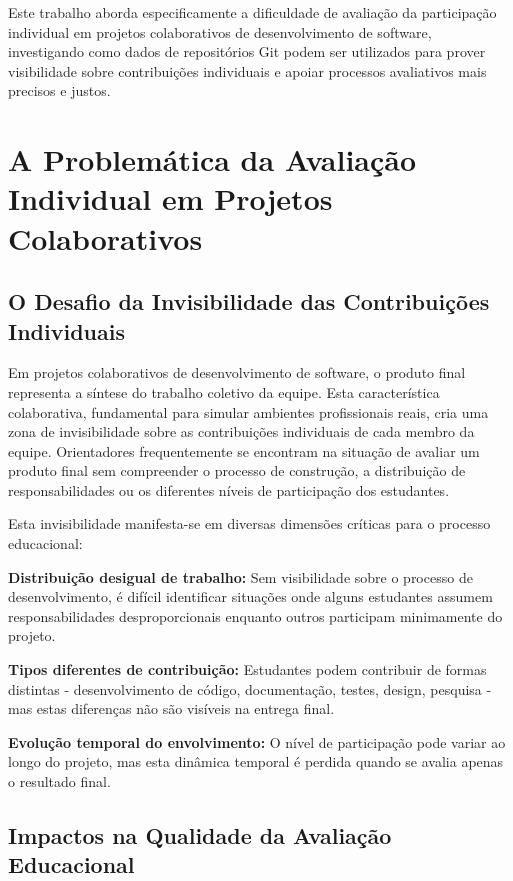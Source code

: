 \documentclass[english, spanish, brazilian]{RBIEarticle} %
\begin{document}
Este trabalho aborda especificamente a dificuldade de avaliação da participação individual em projetos colaborativos de desenvolvimento de software, investigando como dados de repositórios Git podem ser utilizados para prover visibilidade sobre contribuições individuais e apoiar processos avaliativos mais precisos e justos.

\section{A Problemática da Avaliação Individual em Projetos Colaborativos}

\subsection{O Desafio da Invisibilidade das Contribuições Individuais}

Em projetos colaborativos de desenvolvimento de software, o produto final representa a síntese do trabalho coletivo da equipe. Esta característica colaborativa, fundamental para simular ambientes profissionais reais, cria uma zona de invisibilidade sobre as contribuições individuais de cada membro da equipe. Orientadores frequentemente se encontram na situação de avaliar um produto final sem compreender o processo de construção, a distribuição de responsabilidades ou os diferentes níveis de participação dos estudantes.

Esta invisibilidade manifesta-se em diversas dimensões críticas para o processo educacional:

\textbf{Distribuição desigual de trabalho:} Sem visibilidade sobre o processo de desenvolvimento, é difícil identificar situações onde alguns estudantes assumem responsabilidades desproporcionais enquanto outros participam minimamente do projeto.

\textbf{Tipos diferentes de contribuição:} Estudantes podem contribuir de formas distintas - desenvolvimento de código, documentação, testes, design, pesquisa - mas estas diferenças não são visíveis na entrega final.

\textbf{Evolução temporal do envolvimento:} O nível de participação pode variar ao longo do projeto, mas esta dinâmica temporal é perdida quando se avalia apenas o resultado final.

\subsection{Impactos na Qualidade da Avaliação Educacional}
\end{document}
